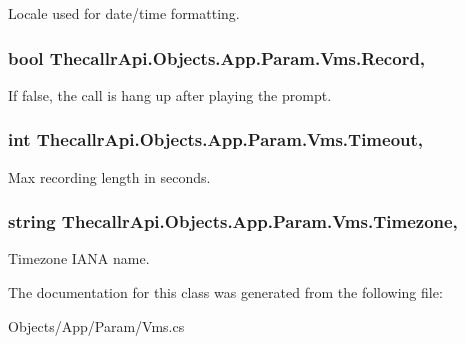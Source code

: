 Locale used for date/time formatting. 

\hypertarget{class_thecallr_api_1_1_objects_1_1_app_1_1_param_1_1_vms_a22fad0cb2e2243b2712445daf007a97c}{
\subsubsection[{Record}]{\setlength{\rightskip}{0pt plus 5cm}bool Thecallr\+Api.\+Objects.\+App.\+Param.\+Vms.\+Record\hspace{0.3cm}{\ttfamily [get]}, {\ttfamily [set]}}}\label{class_thecallr_api_1_1_objects_1_1_app_1_1_param_1_1_vms_a22fad0cb2e2243b2712445daf007a97c}


If {\ttfamily false}, the call is hang up after playing the prompt. 

\hypertarget{class_thecallr_api_1_1_objects_1_1_app_1_1_param_1_1_vms_ad443b458fb9fd27b6ac5b900d6ad284c}{
\subsubsection[{Timeout}]{\setlength{\rightskip}{0pt plus 5cm}int Thecallr\+Api.\+Objects.\+App.\+Param.\+Vms.\+Timeout\hspace{0.3cm}{\ttfamily [get]}, {\ttfamily [set]}}}\label{class_thecallr_api_1_1_objects_1_1_app_1_1_param_1_1_vms_ad443b458fb9fd27b6ac5b900d6ad284c}


Max recording length in seconds. 

\hypertarget{class_thecallr_api_1_1_objects_1_1_app_1_1_param_1_1_vms_a9abf635b1d566fa90a73a857e42b0f30}{
\subsubsection[{Timezone}]{\setlength{\rightskip}{0pt plus 5cm}string Thecallr\+Api.\+Objects.\+App.\+Param.\+Vms.\+Timezone\hspace{0.3cm}{\ttfamily [get]}, {\ttfamily [set]}}}\label{class_thecallr_api_1_1_objects_1_1_app_1_1_param_1_1_vms_a9abf635b1d566fa90a73a857e42b0f30}


Timezone I\+A\+N\+A name. 



The documentation for this class was generated from the following file\+:\begin{DoxyCompactItemize}
\item 
Objects/\+App/\+Param/Vms.\+cs\end{DoxyCompactItemize}
